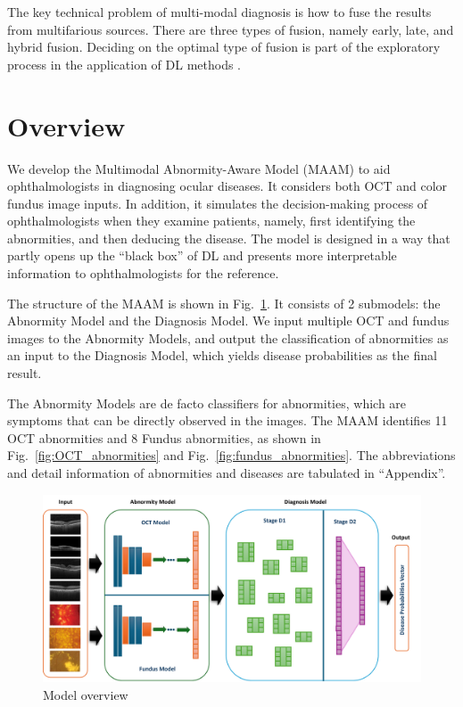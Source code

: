 \documentclass{article}
\begin{document}
\begin{multicols}{2}
	The key technical problem of multi-modal diagnosis is how to fuse the results from multifarious sources. There are three types of fusion, namely early, late, and hybrid fusion. Deciding on the optimal type of fusion is part of the exploratory process in the application of DL methods \autocite{Ichhpujani_Thakur_2021}.
	
	\section{Overview}
	\label{sec:overview}
	
	We develop the Multimodal Abnormity-Aware Model (MAAM) to aid ophthalmologists in diagnosing ocular diseases. It considers both OCT and color fundus image inputs. In addition, it simulates the decision-making process of ophthalmologists when they examine patients, namely, first identifying the abnormities, and then deducing the disease. The model is designed in a way that partly opens up the ``black box'' of DL and presents more interpretable information to ophthalmologists for the reference. 
	
	The structure of the MAAM is shown in Fig.~\ref{fig:3_parts}. It consists of 2 submodels: the Abnormity Model and the Diagnosis Model. We input multiple OCT and fundus images to the Abnormity Models, and output the classification of abnormities as an input to the Diagnosis Model, which yields disease probabilities as the final result.
	
	\vspace{0.5cm}
	
	The Abnormity Models are de facto classifiers for abnormities, which are symptoms that can be directly observed in the images. The MAAM identifies 11 OCT abnormities and 8 Fundus abnormities, as shown in Fig.~\ref{fig:OCT_abnormities} and Fig.~\ref{fig:fundus_abnormities}. The abbreviations and detail information of abnormities and diseases are tabulated in ``Appendix''.
	
	\end{multicols}

	\begin{figure}[htbp]
	\centering
	\includegraphics[width=\linewidth]{Figs/model_overview.pdf}
	\caption{Model overview}
	\vspace{0.3cm}
	\label{fig:3_parts}
	\end{figure}
\end{document}
